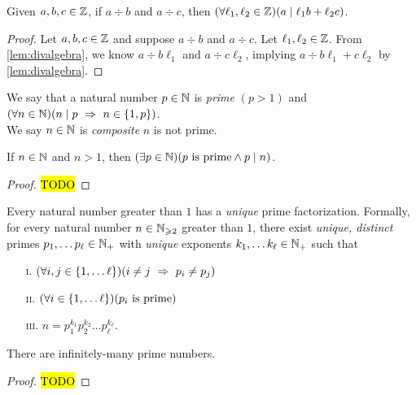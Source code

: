 \newpage

\begin{corollary}
    Given $a, b, c \in \mathbb{Z}$, if $a \div b$ and $a \div c$,
    then $\pn*{\forall \ell_1, \ell_2 \in \Z}\pn*{a \div \ell_1b + \ell_2c}$.
\end{corollary}
\begin{proof}
    Let $a, b, c \in \mathbb{Z}$ and suppose $a \div b$ and $a \div c$.
    Let $\ell_1, \ell_2 \in \mathbb{Z}$.
    From \autoref{lem:divalgebra}, we know $a \div b\ell_1$ and $a \div c\ell_2$,
    implying $a \div b\ell_1 + c\ell_2$ by \autoref{lem:divalgebra}.
\end{proof}

\begin{definition}
    We say that a natural number $p \in \mathbb{N}$ is \emph{prime} \iffbydefn 
    $(p > 1)$ and $\pn*{\forall n \in \N}\pn*{n \div p \implies n \in \set*{1, p}}$.\\
    We say $n \in \mathbb{N}$ is \emph{composite} \iffbydefn $n$ is not prime.
\end{definition}

\begin{lemma}
    If $n \in \mathbb{N}$ and $n > 1$, then $\pn*{\exists p \in \N}\pn*{p \text{ is prime} \meet p \div n}$.
\end{lemma}
\begin{proof}
    \hl{TODO}
\end{proof}

\begin{theorem}
    Every natural number greater than $1$ has a \emph{unique} prime factorization.
    Formally, for every natural number $n \in \mathbb{N}_{\geqslant 2}$ greater than $1$,
    there exist \emph{unique, distinct} primes $p_1, \dots p_\ell \in \mathbb{N}_+$
    with \emph{unique} exponents $k_1, \dots k_\ell \in \mathbb{N}_+$ such that
    \begin{enumerate}
        \item[\textsc{i.}]
            $\pn*{\forall i, j \in \set*{1, \dots \ell}}\pn*{i \neq j \implies p_i \neq p_j}$
        \item[\textsc{ii.}]
            $\pn*{\forall i \in \set*{1, \dots \ell}}\pn*{p_i \text{ is prime}}$
        \item[\textsc{iii.}]
            $n = p_1^{k_1} p_2^{k_2} \dots p_\ell^{k_\ell}$.
    \end{enumerate}
\end{theorem}

\begin{theorem}
    There are infinitely-many prime numbers.
\end{theorem}
\begin{proof}
    \hl{TODO}
\end{proof}


